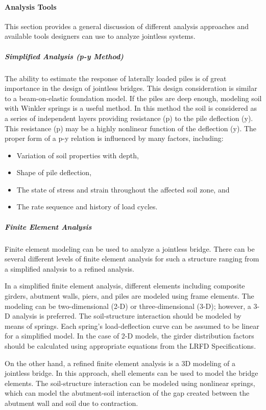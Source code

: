 \paragraph{Analysis Tools}
This section provides a general discussion of different analysis approaches and available tools designers can use
to analyze jointless systems.

\subparagraph{Simplified Analysis (p-y Method)}
The ability to estimate the response of laterally loaded piles is of great importance in the design of jointless
bridges. This design consideration is similar to a beam-on-elastic foundation model. If the piles are deep enough,
modeling soil with Winkler springs is a useful method. In this method the soil is considered as a series of independent
layers providing resistance (p) to the pile deflection (y). This resistance (p) may be a highly nonlinear function of the
deflection (y). The proper form of a p-y relation is influenced by many factors, including:
\begin{itemize}
  \item Variation of soil properties with depth,
  \item Shape of pile deflection,
  \item The state of stress and strain throughout the affected soil zone, and
  \item The rate sequence and history of load cycles.
\end{itemize}

\subparagraph{Finite Element Analysis}
Finite element modeling can be used to analyze a jointless bridge. There can be several different levels of finite
element analysis for such a structure ranging from a simplified analysis to a refined analysis.

In a simplified finite element analysis, different elements including composite girders, abutment walls, piers, and
piles are modeled using frame elements. The modeling can be two-dimensional (2-D) or three-dimensional (3-D);
however, a 3-D analysis is preferred. The soil-structure interaction should be modeled by means of springs. Each
spring’s load-deflection curve can be assumed to be linear for a simplified model. In the case of 2-D models, the
girder distribution factors should be calculated using appropriate equations from the LRFD Specifications.

On the other hand, a refined finite element analysis is a 3D modeling of a jointless bridge. In this approach, shell
elements can be used to model the bridge elements. The soil-structure interaction can be modeled using nonlinear
springs, which can model the abutment-soil interaction of the gap created between the abutment wall and soil due to
contraction.

